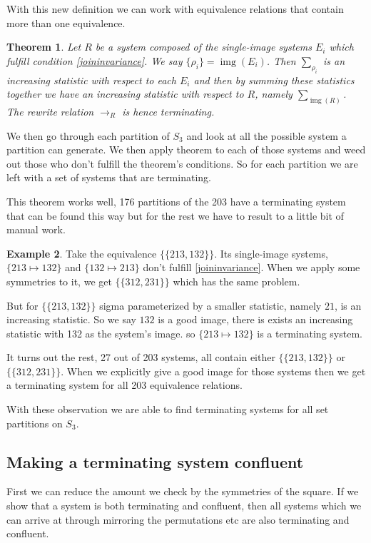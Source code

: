 \documentclass[openany, a4paper, 11pt, english]{article}
\newcommand{\patternrule}{ \mapsto \!}
\newtheorem{theorem}{Theorem}[section]
\theoremstyle{definition}
\newtheorem{example}[theorem]{Example}
\newcommand{\Sym}{S}
\DeclareMathOperator{\img}{img}
\begin{document}
With this new definition we can work with equivalence relations that contain more than one
equivalence.

\begin{theorem}
    Let $R$ be a system composed of the single-image systems $E_i$ which fulfill
    condition \eqref{joininvariance}. We say $\{\rho_i\} = \img(E_i)$. Then
    $\sum\nolimits_{\rho_i}$ is an increasing statistic with respect to each
    $E_i$ and then by summing these statistics together we have an increasing
    statistic with respect to $R$, namely $\sum_{\img(R)}$.  The rewrite
    relation $\to_R$ is hence terminating.
\end{theorem}

We then go through each partition of $\Sym_3$ and look at all the possible
system a partition can generate. We then apply theorem to each of those systems
and weed out those who don't fulfill the theorem's conditions. So for each
partition we are left with a set of systems that are terminating.

This theorem works well, 176 partitions of the 203 have a terminating system
that can be found this way but for the rest we have to result to a little bit of
manual work.

\begin{example}
    Take the equivalence $\{ \{ 213, 132 \} \}$. Its single-image systems,
    ${\{ 213 \patternrule 132 \}}$ and ${\{ 132 \patternrule 213 \}}$
    don't fulfill \eqref{joininvariance}.
    When we apply some symmetries to it, we get $\{ \{ 312, 231 \} \}$ which has the same problem.

    But for $\{ \{ 213, 132 \} \}$ sigma parameterized by a smaller statistic, namely $21$, is an
    increasing statistic. So we say $132$ is a good image, there is exists an
    increasing statistic with 132 as the system's image.
    so $\{ 213 \patternrule 132 \}$ is a terminating system.
\end{example}

It turns out the rest, 27 out of 203 systems, all contain either $\{ \{ 213, 132
\} \}$ or $\{ \{ 312, 231 \} \}$. When we explicitly give a good image for those
systems then we get a terminating system for all 203 equivalence relations.

With these observation we are able to find terminating systems for all set
partitions on $\Sym_3$.

\subsection{Making a terminating system confluent}
First we can reduce the amount we check by the symmetries of the square.
If we show that a system is both terminating and confluent, then all systems
which we can arrive at through mirroring the permutations etc are also
terminating and confluent.
\end{document}
